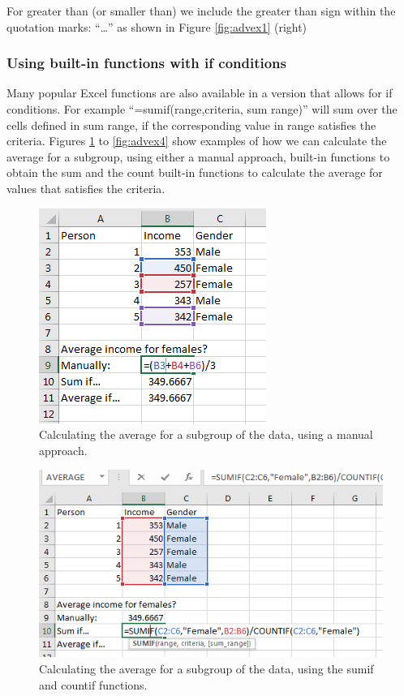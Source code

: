 \documentclass[]{book}
\begin{document}
For greater than (or smaller than) we include the greater than sign within the quotation marks: ``\ldots{}'' as shown in Figure \ref{fig:advex1} (right)

\hypertarget{using-built-in-functions-with-if-conditions}{%
\subsubsection*{Using built-in functions with if conditions}\label{using-built-in-functions-with-if-conditions}}

Many popular Excel functions are also available in a version that allows for if conditions. For example ``=sumif(range,criteria, sum range)'' will sum over the cells defined in sum range, if the corresponding value in range satisfies the criteria. Figures \ref{fig:advex2} to \ref{fig:advex4} show examples of how we can calculate the average for a subgroup, using either a manual approach, built-in functions to obtain the sum and the count built-in functions to calculate the average for values that satisfies the criteria.

\begin{figure}

{\centering \includegraphics[width=0.5\linewidth]{_resources/chapter_advexc/9} 

}

\caption{Calculating the average for a subgroup of the data, using a manual approach.}\label{fig:advex2}
\end{figure}

\begin{figure}

{\centering \includegraphics[width=0.8\linewidth]{_resources/chapter_advexc/10} 

}

\caption{Calculating the average for a subgroup of the data, using the sumif and countif functions.}\label{fig:advex3}
\end{figure}
\end{document}
